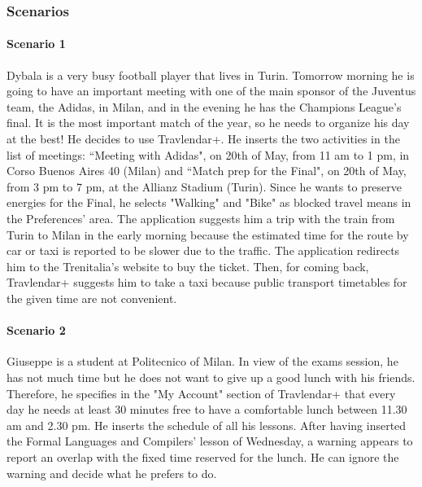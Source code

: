 \documentclass[12pt,titlepage]{article}
\begin{document}
\subsubsection{Scenarios}\label{sec:mod1}
\paragraph{Scenario 1} 
Dybala is a very busy football player that lives in Turin. Tomorrow morning he is going to have an important meeting with one of the main sponsor of the Juventus team, the Adidas, in Milan, and in the evening he has the Champions League's final. It is the most important match of the year, so he needs to organize his day at the best! He decides to use Travlendar+. He inserts the two activities in the list of meetings: ``Meeting with Adidas", on 20th of May, from 11 am to 1 pm, in Corso Buenos Aires 40 (Milan) and ``Match prep for the Final", on 20th of May, from 3 pm to 7 pm, at the Allianz Stadium (Turin). Since he wants to preserve energies for the Final, he selects "Walking" and "Bike" as blocked travel means in the Preferences' area. The application suggests him a trip with the train from Turin to Milan in the early morning because the estimated time for the route by car or taxi is reported to be slower due to the traffic. The application redirects him to the Trenitalia's website to buy the ticket. Then, for coming back, Travlendar+ suggests him to take a taxi because public transport timetables for the given time are not convenient. 

\paragraph{Scenario 2}
Giuseppe is a student at Politecnico of Milan. In view of the exams session, he has not much time but he does not want to give up a good lunch with his friends. Therefore, he specifies in the "My Account" section of Travlendar+ that every day he needs at least 30 minutes free to have a comfortable lunch between 11.30 am and 2.30 pm. He inserts the schedule of all his lessons. After having inserted the Formal Languages and Compilers' lesson of Wednesday, a warning appears to report an overlap with the fixed time reserved for the lunch. He can ignore the warning and decide what he prefers to do.
\end{document}
